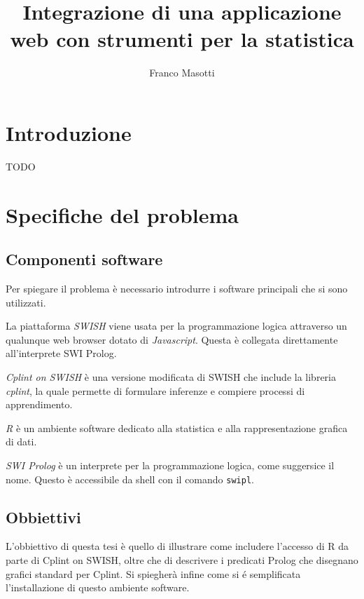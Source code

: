 \documentclass[10pt,titlepage,twoside,a4paper]{report}
\title{Integrazione di una applicazione web con strumenti per la statistica}
\author{Franco Masotti}
\begin{document}

\maketitle
\newpage
\tableofcontents
\newpage
\listoffigures
\newpage
\listoflistings
\cleardoublepage





\chapter{Introduzione} \label{introduzione}

TODO

\chapter{Specifiche del problema} \label{ch:specifiche-del-problema}
    \section{Componenti software}
Per spiegare il problema è necessario introdurre i software principali che si 
sono utilizzati.

La piattaforma \emph{SWISH}\cite{SWISH} viene usata per la programmazione 
logica attraverso un qualunque web browser dotato di \emph{Javascript}. Questa 
è collegata direttamente all'interprete SWI Prolog.

\emph{Cplint on SWISH} è una versione modificata di SWISH che include la 
libreria \emph{cplint}, la quale permette di formulare inferenze e 
compiere processi di apprendimento\cite{cplint}.

\emph{R} è un ambiente software dedicato alla statistica e 
alla rappresentazione grafica di dati\cite{r}.

\emph{SWI Prolog} è un interprete per la programmazione 
logica\cite{swiprolog}, come suggersice il nome\cite{prolog}.
Questo è accessibile da shell con il comando \texttt{swipl}.

    \section{Obbiettivi}
L'obbiettivo di questa tesi è quello di illustrare come includere l'accesso di 
R da parte di Cplint on SWISH, oltre che di descrivere i predicati Prolog che 
disegnano grafici standard per Cplint. Si spiegherà infine come si \'e 
semplificata l'installazione di questo ambiente software.
\end{document}
